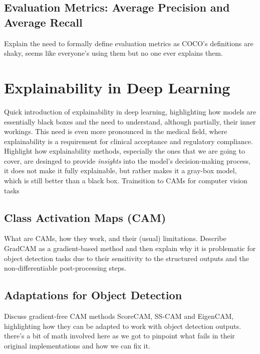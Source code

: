 \subsection{Evaluation Metrics: Average Precision and Average Recall}
Explain the need to formally define evaluation metrics as COCO's definitions are shaky, seems like everyone's using them but no one ever explains them.

\section{Explainability in Deep Learning}
Quick introduction of explainability in deep learning, highlighting how models are essentially black boxes and the need to understand, although partially, their inner workings. This need is even more pronounced in the medical field, where explainability is a requirement for clinical acceptance and regulatory compliance. Highlight how explainability methods, especially the ones that we are going to cover, are desinged to provide \emph{insights} into the model's decision-making process, it does not make it fully explainable, but rather makes it a gray-box model, which is still better than a black box.
Trainsition to CAMs for computer vision tasks

\subsection{Class Activation Maps (CAM)}
What are CAMs, how they work, and their (usual) limitations. Describe GradCAM as a gradient-based method and then explain why it is problematic for object detection tasks due to their sensitivity to the structured outputs and the non-differentiable post-processing steps. 

\subsection{Adaptations for Object Detection}
Discuss gradient-free CAM methods ScoreCAM, SS-CAM and EigenCAM, highlighting how they can be adapted to work with object detection outputs. there's a bit of math involved here as we got to pinpoint what fails in their original implementations and how we can fix it.
